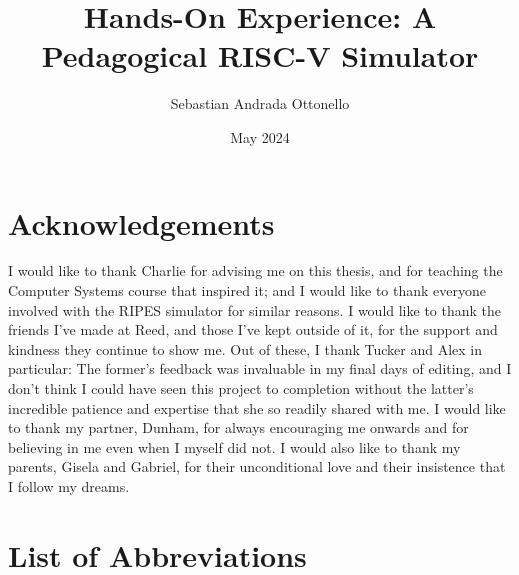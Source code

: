 \documentclass[12pt,twoside]{reedthesis}
\title{Hands-On Experience: A Pedagogical RISC-V Simulator}
\author{Sebastian Andrada Ottonello}
\date{May 2024}
\begin{document}
\maketitle
\frontmatter %
\pagestyle{empty} %

\chapter*{Acknowledgements}
I would like to thank Charlie for advising me on this thesis, and for teaching the Computer Systems course that inspired it; and I would like to thank everyone involved with the RIPES simulator for similar reasons.
I would like to thank the friends I've made at Reed, and those I've kept outside of it, for the support and kindness they continue to show me. Out of these, I thank Tucker and Alex in particular: The former's feedback was invaluable in my final days of editing, and I don't think I could have seen this project to completion without the latter's incredible patience and expertise that she so readily shared with me.
I would like to thank my partner, Dunham, for always encouraging me onwards and for believing in me even when I myself did not.
I would also like to thank my parents, Gisela and Gabriel, for their unconditional love and their insistence that I follow my dreams.




\chapter*{List of Abbreviations}
\end{document}
